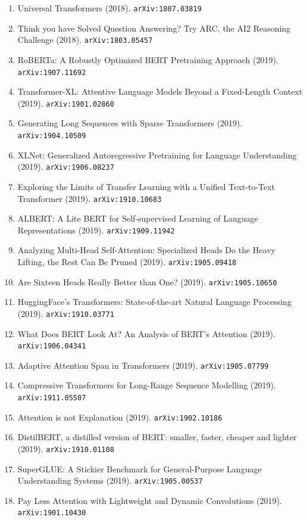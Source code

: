 \documentclass[11pt]{article}
\begin{document}
\begin{enumerate}
  Translation (2018). \texttt{arXiv:1804.09849}
  \item Universal Transformers (2018). \texttt{arXiv:1807.03819}
  \item Think you have Solved Question Answering? Try ARC, the AI2 Reasoning
  Challenge (2018). \texttt{arXiv:1803.05457}
  \item RoBERTa: A Robustly Optimized BERT Pretraining Approach (2019). \texttt{arXiv:1907.11692}
  \item Transformer-XL: Attentive Language Models Beyond a Fixed-Length Context (2019). \texttt{arXiv:1901.02860}
  \item Generating Long Sequences with Sparse Transformers (2019). \texttt{arXiv:1904.10509}
  \item XLNet: Generalized Autoregressive Pretraining for Language Understanding (2019). \texttt{arXiv:1906.08237}
  \item Exploring the Limits of Transfer Learning with a Unified Text-to-Text
  Transformer (2019). \texttt{arXiv:1910.10683}
  \item ALBERT: A Lite BERT for Self-supervised Learning of Language
  Representations (2019). \texttt{arXiv:1909.11942}
  \item Analyzing Multi-Head Self-Attention: Specialized Heads Do the Heavy
  Lifting, the Rest Can Be Pruned (2019). \texttt{arXiv:1905.09418}
  \item Are Sixteen Heads Really Better than One? (2019). \texttt{arXiv:1905.10650}
  \item HuggingFace's Transformers: State-of-the-art Natural Language Processing (2019). \texttt{arXiv:1910.03771}
  \item What Does BERT Look At? An Analysis of BERT's Attention (2019). \texttt{arXiv:1906.04341}
  \item Adaptive Attention Span in Transformers (2019). \texttt{arXiv:1905.07799}
  \item Compressive Transformers for Long-Range Sequence Modelling (2019). \texttt{arXiv:1911.05507}
  \item Attention is not Explanation (2019). \texttt{arXiv:1902.10186}
  \item DistilBERT, a distilled version of BERT: smaller, faster, cheaper and
  lighter (2019). \texttt{arXiv:1910.01108}
  \item SuperGLUE: A Stickier Benchmark for General-Purpose Language
  Understanding Systems (2019). \texttt{arXiv:1905.00537}
  \item Pay Less Attention with Lightweight and Dynamic Convolutions (2019). \texttt{arXiv:1901.10430}

\end{enumerate}
\end{document}
